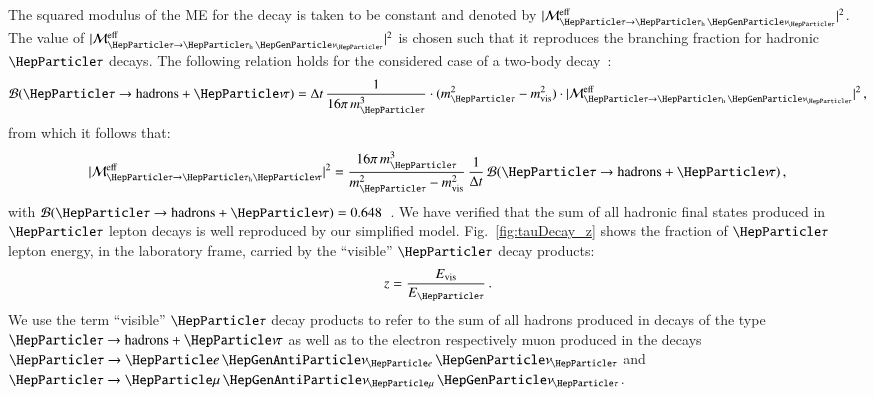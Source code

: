 The squared modulus of the ME for the decay is taken to be constant and denoted by $\vert\mathcal{M}^{\eff}_{\Pgt \to \tauhnu}\vert^{2}$.
The value of $\vert\mathcal{M}^{\eff}_{\Pgt \to \tauhnu}\vert^{2}$ is
chosen such that it reproduces the branching fraction for hadronic $\Pgt$ decays.
The following relation holds for the considered case of a two-body decay~\cite{Barger:1987nn}:
\begin{equation}
\mathcal{B}(\Pgt \to \textrm{hadrons} + \Pnut) = \Delta t \, \frac{1}{16 \pi \, m_{\Pgt}^{3}} \cdot (m_{\Pgt}^{2} - m_{\vis}^{2}) \cdot \vert \mathcal{M}^{\textrm{eff}}_{\Pgt \to
  \tauhnu} \vert^{2} \, ,
\end{equation}
from which it follows that:
\begin{equation}
\vert \mathcal{M}^{\textrm{eff}}_{\Pgt \to \tauh\Pnut} \vert^{2} = \frac{16 \pi \, m_{\Pgt}^{3}}{m_{\Pgt}^{2} - m_{\vis}^{2}} \, \frac{1}{\Delta t} \, \mathcal{B}(\Pgt \to \textrm{hadrons} + \Pnut) \, , 
\end{equation}
with $\mathcal{B}(\Pgt \to \textrm{hadrons} + \Pnut) = 0.648$~\cite{PDG}.
We have verified that the sum of all hadronic final states produced in $\Pgt$ lepton decays
is well reproduced by our simplified model.
Fig.~\ref{fig:tauDecay_z} shows the fraction of $\Pgt$ lepton energy,
in the laboratory frame, carried by the ``visible'' $\Pgt$ decay
products:
\begin{equation}
z = \frac{E_{\vis}}{E_{\Pgt}} \, .
\label{eq:def_z}
\end{equation}
We use the term ``visible'' $\Pgt$ decay products to refer to the sum
of all hadrons produced in decays of the type $\Pgt \to \textrm{hadrons} + \Pnut$ 
as well as to the electron respectively muon produced in the decays $\Pgt \to \enunu$ and $\Pgt \to \mununu$.

